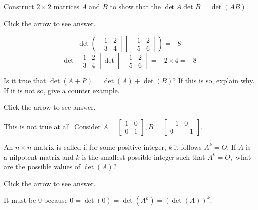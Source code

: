 \documentclass{ximera}
\begin{document}
\begin{problem}\label{prb:7.16} Construct $2\times 2$ matrices $A$ and $B$ to show that the
$\det A \det B = \det (AB)$.

Click the arrow to see answer.
\begin{expandable}
\[
\det
\left( \left[
\begin{array}{cc}
1 & 2 \\
3 & 4
\end{array}
\right] \left[
\begin{array}{rr}
-1 & 2 \\
-5 & 6
\end{array}
\right] \right) = -8
\]
\[
\det \left[
\begin{array}{cc}
1 & 2 \\
3 & 4
\end{array}
\right] \det \left[
\begin{array}{rr}
-1 & 2 \\
-5 & 6
\end{array}
\right] = -2 \times 4 = -8
\]
\end{expandable}
\end{problem}

\begin{problem}\label{prb:7.17} Is it true that $\det \left( A+B\right) =\det \left( A\right) +\det
\left( B\right) ?$ If this is so, explain why. If it is not so,
give a counter example.

Click the arrow to see answer.
\begin{expandable}
This is not true at all. Consider $A=\left[
\begin{array}{cc}
1 & 0 \\
0 & 1
\end{array}
\right] ,B=\left[
\begin{array}{rr}
-1 & 0 \\
0 & -1
\end{array}
\right] .$
\end{expandable}
\end{problem}

\begin{problem}\label{prb:7.18} An $n\times n$ matrix is called 
if for some positive integer, $k$ it follows $A^{k}=O.$ If
$A$ is a nilpotent matrix and $k$ is the smallest possible integer such that
$A^{k}=O,$ what are the possible values of $\det \left( A\right)$?

Click the arrow to see answer.
\begin{expandable}
It must
be $0$ because $0=\det \left( 0\right) =\det \left( A^{k}\right) =\left( \det
\left( A\right) \right) ^{k}.$
\end{expandable}
\end{problem}
\end{document}
